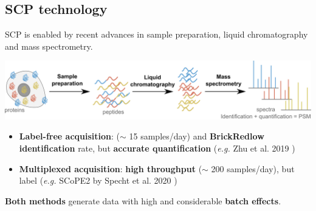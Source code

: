 \documentclass{article}
\begin{document}
\setlength{\columnsep}{0.5cm}
\begin{multicols}{2}

\noindent
\begin{minipage}[t]{\linewidth}
  \vspace{0.5cm}
  \section*{\huge SCP technology}
  
  SCP is enabled by recent advances in sample preparation, liquid
  chromatography and mass spectrometry. 
  
  \includegraphics[width=\linewidth]{figs/MS-SCP.png}
  
  \begin{itemize}
  
  \item \textbf{Label-free acquisition}: \textbf{\color{BrickRed}{low 
  throughput}} ($\sim$ 15 samples/day) and \textbf{\color
  {BrickRed}{low identification}} rate, but \textbf{\color{OliveGreen}
  {accurate quantification}} (\textit{e.g.} Zhu et al. 2019 
  \cite{Zhu2019-ja})
  
  \item \textbf{Multiplexed acquisition}: \textbf{\color{OliveGreen}
  {high throughput}} ($\sim$ 200 samples/day), but label 
  \textbf{\color{BrickRed}{cross-contamination}} (\textit{e.g.} SCoPE2
  by Specht et al. 2020 \cite{Specht2020-jm})
  
  \end{itemize}
  
  \textbf{Both methods} generate data with high \textbf{\color{
  BrickRed}{missingness}} and considerable \textbf{\color{BrickRed}
  {batch effects}}.
  
\end{minipage}


\noindent
\begin{minipage}[t]{\linewidth}
  \vspace{0.5cm}

\end{minipage}
\end{multicols}
\end{document}
